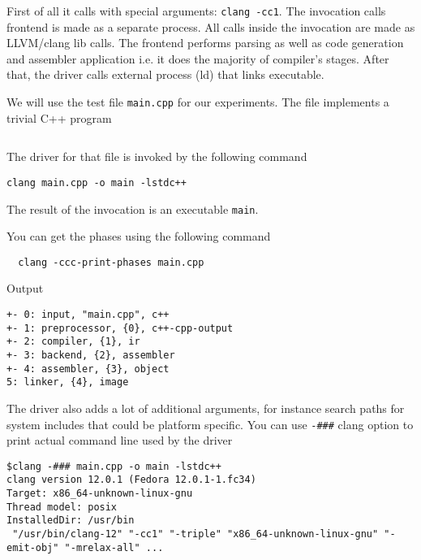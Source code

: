 First of all it calls \clang with special arguments: \texttt{clang
  -cc1}. The invocation calls \clang frontend is made as a separate process. All
calls inside the invocation are made as LLVM/clang lib calls. The frontend
performs parsing as well as code generation and assembler application i.e. it
does the majority of compiler's stages. After that, the driver calls external
process (ld) that links executable. 


We will use the test file \texttt{main.cpp} for our experiments. The
file implements a trivial C++ program
\inputminted{c++}{./src/simple/main.cpp}

The driver for that file is invoked by the following command
\begin{verbatim}
clang main.cpp -o main -lstdc++
\end{verbatim}
The result of the invocation is an executable \texttt{main}. 

You can get the phases using the following command
\begin{verbatim}
  clang -ccc-print-phases main.cpp
\end{verbatim}

Output
\begin{verbatim}
+- 0: input, "main.cpp", c++
+- 1: preprocessor, {0}, c++-cpp-output
+- 2: compiler, {1}, ir
+- 3: backend, {2}, assembler
+- 4: assembler, {3}, object
5: linker, {4}, image
\end{verbatim}

The driver also adds a lot of additional arguments, for instance
search paths for system includes that could be platform specific.
You can use \texttt{-###} clang option to print actual
command line used by the driver
\begin{verbatim}
$clang -### main.cpp -o main -lstdc++
clang version 12.0.1 (Fedora 12.0.1-1.fc34)
Target: x86_64-unknown-linux-gnu
Thread model: posix
InstalledDir: /usr/bin
 "/usr/bin/clang-12" "-cc1" "-triple" "x86_64-unknown-linux-gnu" "-emit-obj" "-mrelax-all" ...
\end{verbatim}


